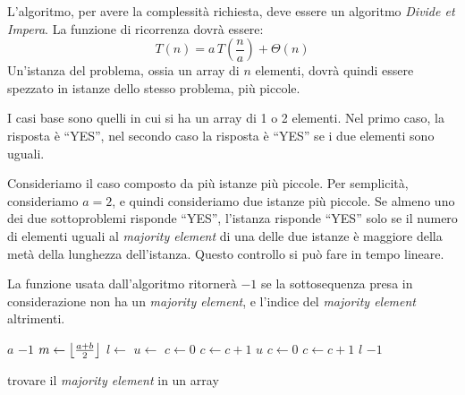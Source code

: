 L'algoritmo, per avere la complessit\`a richiesta, deve essere un algoritmo \emph{Divide et Impera}. La funzione di ricorrenza dovr\`a essere:
\[
T(n) = a \, T \left( \frac{n}{a} \right) + \Theta(n)
\]
Un'istanza del problema, ossia un array di $n$ elementi, dovr\`a quindi essere spezzato in istanze dello stesso problema, pi\`u piccole. 

I casi base sono quelli in cui si ha un array di 1 o 2 elementi. Nel primo caso, la risposta \`e ``YES'', nel secondo caso la risposta \`e ``YES'' se i due elementi sono uguali.

Consideriamo il caso composto da pi\`u istanze pi\`u piccole. Per semplicit\`a, consideriamo $a = 2$, e quindi consideriamo due istanze pi\`u piccole. Se almeno uno dei due sottoproblemi risponde ``YES'', l'istanza risponde ``YES'' solo se il numero di elementi uguali al \emph{majority element} di una delle due istanze \`e maggiore della met\`a della lunghezza dell'istanza. Questo controllo si pu\`o fare in tempo lineare.

La funzione usata dall'algoritmo ritorner\`a $-1$ se la sottosequenza presa in considerazione non ha un \emph{majority element}, e l'indice del \emph{majority element} altrimenti.

\begin{algorithm}
\begin{algorithmic}
            \State \Return $a$
        \Else
            \State \Return $-1$
        \EndIf
    \Else
        \State $m \gets \left\lfloor{\frac{a+b}{2}}\right\rfloor$
        \State $l \gets$ 
        \State $u \gets$ 
            \State $c \gets 0$
                    \State $c \gets c + 1$
                \EndIf
            \EndFor
                \State \Return $u$
            \EndIf
        \EndIf
            \State $c \gets 0$
                    \State $c \gets c + 1$
                \EndIf
            \EndFor
                \State \Return $l$
            \EndIf
        \EndIf
        \State \Return $-1$
    \EndIf
\EndFunction
\end{algorithmic}
\caption{\label{alg_majority_element}trovare il \emph{majority element} in un array}
\end{algorithm}

